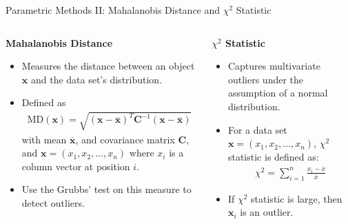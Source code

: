 \begin{frame}{Parametric Methods II: Mahalanobis Distance and $\chi^2$ Statistic}
	\vspace*{-2em}
	\begin{columns}[t]
		\begin{column}{0.5\textwidth}
			\begin{center}
				\textbf{Mahalanobis Distance}
			\end{center}
			\vspace*{-1em}
			\begin{itemize}
				\item Measures the distance between an object $\mathbf{x}$ and the data set's distribution.
				\item Defined as
				      \begin{align*}
					      \text{MD}(\mathbf{x}) = \sqrt{(\mathbf{x} - \mathbf{\overline{x}})^T \mathbf{C}^{-1} (\mathbf{x} - \mathbf{\overline{x}})}
				      \end{align*}
				      with mean $\mathbf{\overline{x}}$, and covariance matrix $\mathbf{C}$, and $\mathbf{x}=(x_1, x_2, \dots, x_n)$ where $x_i$ is a column vector at position $i$.
				\item Use the Grubbs' test on this measure to detect outliers.
			\end{itemize}
		\end{column}

		\begin{column}{0.5\textwidth}
			\begin{center}
				\textbf{$\chi^2$ Statistic}
			\end{center}
			\vspace*{-1em}
			\begin{itemize}
				\item Captures multivariate outliers under the assumption of a normal distribution.
				\item For a data set $\mathbf{x}=(x_1, x_2, \dots, x_n)$, $\chi^2$ statistic is defined as:
				      \begin{align}
					      \chi^2 = \sum_{i=1}^n \frac{x_i - \overline{x}}{\overline{x}}
				      \end{align}
				\item If $\chi^2$ statistic is large, then $\mathbf{x}_i$ is an outlier.
			\end{itemize}
		\end{column}
	\end{columns}
\end{frame}

